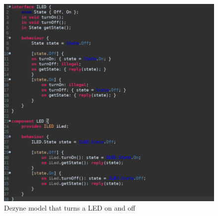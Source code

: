 \documentclass[12pt]{scrreprt}
\begin{document}
\begin{figure}[H]
    \centering
    \includegraphics[width=\textwidth]{Figures/theoretical_background/enhanced_diagram.png}
    \caption{Dezyne model that turns a LED on and off}
    \label{fig:theoretical_background_dezyne_model}
\end{figure}
\end{document}

